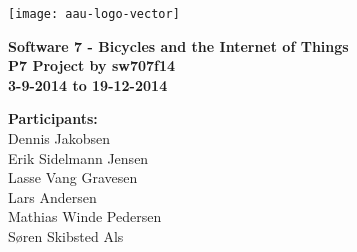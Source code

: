 \thispagestyle{empty} %

\hspace*{-1cm}\parbox[b][\textheight][t]{\textwidth}
{

\begin{center}
	\texttt{[image: aau-logo-vector]}\\
	\vspace{0.25cm}
\end{center} 

\vspace{1cm}
\begin{center}

\textbf{\Huge {Software 7 - Bicycles and the Internet of Things}} \\ \vspace{0.5cm}
\textbf{\Large P7 Project by sw707f14}\\ \vspace{0.5cm}
\textbf{\large 3-9-2014 to 19-12-2014}\\
\end{center}



\vspace{0.25cm}
\begin{center}
\item {\textbf{Participants:}} \\
Dennis Jakobsen\\ Erik Sidelmann Jensen\\ Lasse Vang Gravesen\\ Lars Andersen\\ Mathias Winde Pedersen\\ Søren Skibsted Als\\
\end{center}

\thispagestyle{empty}

\newpage
\thispagestyle{empty}
\mbox{}
}